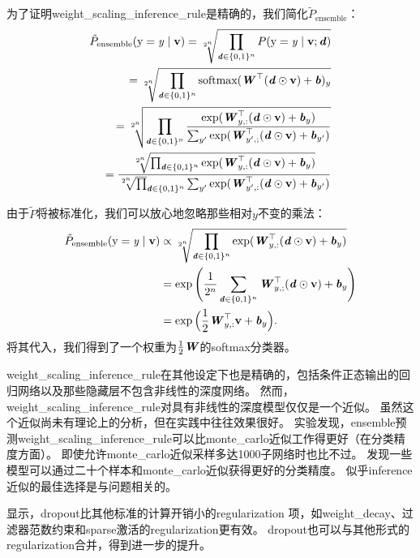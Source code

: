 为了证明\gls{weight_scaling_inference_rule}是精确的，我们简化$ \tilde{P}_{\text{ensemble}}$：
\begin{align}
\tilde{P}_{\text{ensemble}}(\mathrm{y}=\mathit{y} \mid \mathbf{v}) =
\sqrt[2^n]{\prod_{\boldsymbol{\mathit{d}} \in \{0,1\}^n} P(\mathrm{y} = \mathit{y} \mid \mathbf{v}; \boldsymbol{\mathit{d}})} \\
= \sqrt[2^n]{\prod_{\boldsymbol{\mathit{d}} \in \{0,1\}^n} \text{softmax}(\boldsymbol{\mathit{W}}^\top(\boldsymbol{\mathit{d}} \odot \mathbf{v}) + \boldsymbol{\mathit{b}})_y} \\
= \sqrt[2^n]{\prod_{\boldsymbol{\mathit{d}} \in \{0,1\}^n} \frac{\exp (\boldsymbol{\mathit{W}}_{y,:}^\top(\boldsymbol{\mathit{d}} \odot \mathbf{v}) + \boldsymbol{\mathit{b}}_y)}
{\sum_{y'}\exp (\boldsymbol{\mathit{W}}_{y',;}^\top(\boldsymbol{\mathit{d}} \odot \mathbf{v}) + \boldsymbol{\mathit{b}}_{y'})}}\\
=  \frac{\sqrt[2^n]{\prod_{\boldsymbol{\mathit{d}} \in \{0,1\}^n}\exp (\boldsymbol{\mathit{W}}_{y,:}^\top(\boldsymbol{\mathit{d}} \odot \mathbf{v}) + \boldsymbol{\mathit{b}}_y)}}
{ \sqrt[2^n] \prod_{\boldsymbol{\mathit{d}} \in \{0,1\}^n} \sum_{y'}\exp (\boldsymbol{\mathit{W}}_{y',:}^\top(\boldsymbol{\mathit{d}} \odot \mathbf{v}) + \boldsymbol{\mathit{b}}_{y'})}
\end{align}

由于$\tilde P$将被标准化，我们可以放心地忽略那些相对$y$不变的乘法：
\begin{align}
\tilde{P}_{\text{ensemble}}(\mathrm{y}=\mathit{y} \mid \mathbf{v}) &\propto 
\sqrt[2^n]{\prod_{\boldsymbol{\mathit{d}} \in \{0,1\}^n} \exp (\boldsymbol{\mathit{W}}_{y,:}^\top(\boldsymbol{\mathit{d}} \odot \mathbf{v}) + \boldsymbol{\mathit{b}}_y)} \\
& = \exp \Bigg(\frac{1}{2^n} \sum_{\boldsymbol{\mathit{d}} \in \{0,1\}^n} \boldsymbol{\mathit{W}}_{y,;}^\top(\boldsymbol{\mathit{d}} \odot \mathbf{v}) + \boldsymbol{\mathit{b}}_y \Bigg) \\
& = \exp \Big(\frac{1}{2}\boldsymbol{\mathit{W}}_{y,:}^\top \mathbf{v} + \boldsymbol{\mathit{b}}_y \Big) .
\end{align}
将其代入，我们得到了一个权重为$\frac{1}{2}\boldsymbol{\mathit{W}}$的\gls{softmax}分类器。


\gls{weight_scaling_inference_rule}在其他设定下也是精确的，包括条件正态输出的回归网络以及那些隐藏层不包含非线性的深度网络。
然而，\gls{weight_scaling_inference_rule}对具有非线性的深度模型仅仅是一个近似。
虽然这个近似尚未有理论上的分析，但在实践中往往效果很好。
\cite{Goodfellow-et-al-ICML2013}实验发现，\gls{ensemble}预测\gls{weight_scaling_inference_rule}可以比\gls{monte_carlo}近似工作得更好（在分类精度方面）。
即使允许\gls{monte_carlo}近似采样多达1000子网络时也比不过。
\cite{gal2015bayesian}发现一些模型可以通过二十个样本和\gls{monte_carlo}近似获得更好的分类精度。
似乎\gls{inference}近似的最佳选择是与问题相关的。

\cite{Srivastava14}显示，\gls{dropout}比其他标准的计算开销小的\gls{regularization} 项，如\gls{weight_decay}、过滤器范数约束和\gls{sparse}激活的\gls{regularization}更有效。
\gls{dropout}也可以与其他形式的\gls{regularization}合并，得到进一步的提升。

